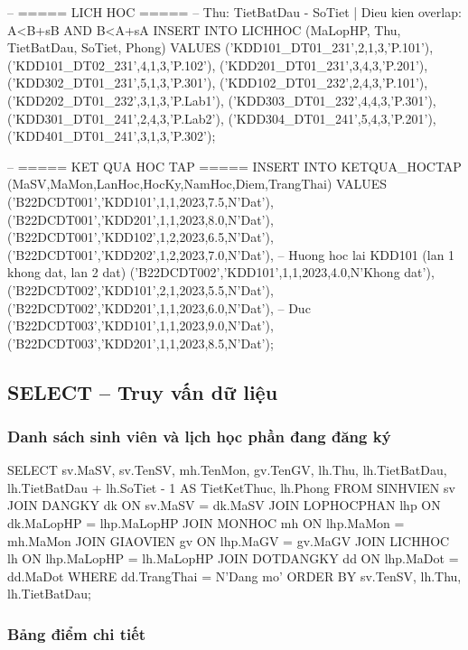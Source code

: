 \documentclass[13pt, a4paper]{article}
\begin{document}
\begin{sqlbox}
-- ===== LICH HOC =====
-- Thu: TietBatDau - SoTiet | Dieu kien overlap: A<B+sB AND B<A+sA
INSERT INTO LICHHOC (MaLopHP, Thu, TietBatDau, SoTiet, Phong) VALUES
('KDD101_DT01_231',2,1,3,'P.101'),
('KDD101_DT02_231',4,1,3,'P.102'),
('KDD201_DT01_231',3,4,3,'P.201'),
('KDD302_DT01_231',5,1,3,'P.301'),
('KDD102_DT01_232',2,4,3,'P.101'),
('KDD202_DT01_232',3,1,3,'P.Lab1'),
('KDD303_DT01_232',4,4,3,'P.301'),
('KDD301_DT01_241',2,4,3,'P.Lab2'),
('KDD304_DT01_241',5,4,3,'P.201'),
('KDD401_DT01_241',3,1,3,'P.302');

-- ===== KET QUA HOC TAP =====
INSERT INTO KETQUA_HOCTAP (MaSV,MaMon,LanHoc,HocKy,NamHoc,Diem,TrangThai) VALUES
('B22DCDT001','KDD101',1,1,2023,7.5,N'Dat'),
('B22DCDT001','KDD201',1,1,2023,8.0,N'Dat'),
('B22DCDT001','KDD102',1,2,2023,6.5,N'Dat'),
('B22DCDT001','KDD202',1,2,2023,7.0,N'Dat'),
-- Huong hoc lai KDD101 (lan 1 khong dat, lan 2 dat)
('B22DCDT002','KDD101',1,1,2023,4.0,N'Khong dat'),
('B22DCDT002','KDD101',2,1,2023,5.5,N'Dat'),
('B22DCDT002','KDD201',1,1,2023,6.0,N'Dat'),
-- Duc
('B22DCDT003','KDD101',1,1,2023,9.0,N'Dat'),
('B22DCDT003','KDD201',1,1,2023,8.5,N'Dat');
\end{sqlbox}

\subsection{SELECT -- Truy vấn dữ liệu}

\subsubsection{Danh sách sinh viên và lịch học phần đang đăng ký}

\begin{sqlbox}
SELECT sv.MaSV, sv.TenSV, mh.TenMon, gv.TenGV,
       lh.Thu, lh.TietBatDau, lh.TietBatDau + lh.SoTiet - 1 AS TietKetThuc,
       lh.Phong
FROM   SINHVIEN sv
JOIN   DANGKY      dk  ON sv.MaSV     = dk.MaSV
JOIN   LOPHOCPHAN  lhp ON dk.MaLopHP  = lhp.MaLopHP
JOIN   MONHOC      mh  ON lhp.MaMon   = mh.MaMon
JOIN   GIAOVIEN    gv  ON lhp.MaGV    = gv.MaGV
JOIN   LICHHOC     lh  ON lhp.MaLopHP = lh.MaLopHP
JOIN   DOTDANGKY   dd  ON lhp.MaDot   = dd.MaDot
WHERE  dd.TrangThai = N'Dang mo'
ORDER  BY sv.TenSV, lh.Thu, lh.TietBatDau;
\end{sqlbox}

\subsubsection{Bảng điểm chi tiết}
\end{document}
